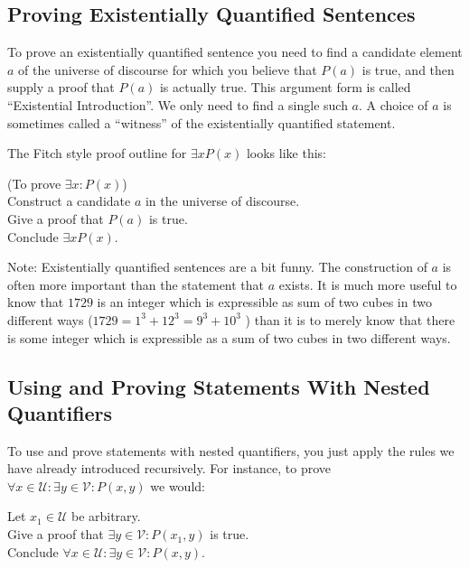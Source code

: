 \subsection{Proving Existentially Quantified Sentences}

To prove an existentially quantified sentence you need to find a candidate element $a$ of the universe of discourse for which you believe that $P(a)$ is true, and then supply a proof that $P(a)$ is actually true.  This argument form is called ``Existential Introduction''.  We only need to find a single such $a$.  A choice of $a$ is sometimes called a ``witness'' of the existentially quantified statement.

The Fitch style proof outline for $\exists x P(x)$ looks like this:

\begin{fitch*}
	\textrm{(To prove $\exists x: P(x)$)}\\
	\textrm{Construct a candidate $a$ in the universe of discourse.}\\
	\textrm{Give a proof that $P(a)$ is true.}\\
	\textrm{Conclude $\exists x P(x)$.}
\end{fitch*} 

Note:  Existentially quantified sentences are a bit funny.  The construction of $a$ is often more important than the statement that $a$ exists.  It is much more useful to know that $1729$ is an integer which is expressible as sum of two cubes in two different ways ($1729 = 1^3+12^3 = 9^3+10^3$ ) than it is to merely know that there is some integer which is expressible as a sum of two cubes in two different ways.

\subsection{Using and Proving Statements With Nested Quantifiers}

To use and prove statements with nested quantifiers, you just apply the rules we have already introduced recursively.  For instance, to prove $\forall x \in \mathcal{U}: \exists y \in \mathcal{V}: P(x,y)$ we would:

\begin{fitch*}
	\textrm{Let $x_1 \in \mathcal{U}$ be arbitrary.}\\
	\textrm{Give a proof that $\exists y \in \mathcal{V}: P(x_1,y)$ is true.}\\
	\textrm{Conclude $\forall x \in \mathcal{U}: \exists y \in \mathcal{V}: P(x,y)$.}
\end{fitch*} 

